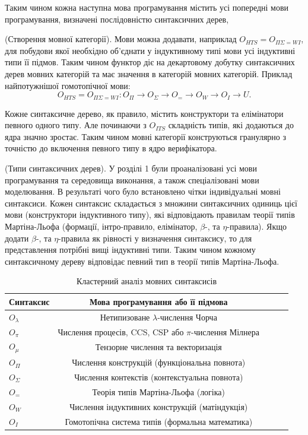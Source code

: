 Таким чином кожна наступна мова програмування містить усі попередні
мови програмування, визначені послідовністю синтаксичних дерев,

\begin{definition} (Створення мовної категорії).
Мови можна додавати, наприклад $O_{HTS} = O_{\Pi\Sigma=WI}$, для побудови якої необхідно
об'єднати у індуктивному типі мови усі індуктивні типи її підмов.
Таким чином функтор діє на декартовому добутку синтаксичних дерев мовних категорій
та має значення в категорій мовних категорій. Приклад найпотужнішої гомотопічної мови:
\begin{equation}
O_{HTS} = O_{\Pi\Sigma=WI} : O_\Pi \rightarrow O_\Sigma \rightarrow O_= \rightarrow O_W \rightarrow O_I \rightarrow U.
\end{equation}
\end{definition}

Кожне синтаксичне дерево, як правило, містить конструктори
та елімінатори певного одного типу. Але починаючи з $O_{ITS}$
складність типів, які додаються до ядра значно зростає.
Таким чином мовні категорії конструються гранулярно з
точністю до включення певного типу в ядро верифікатора.

\begin{definition} (Типи синтаксичних дерев).
У розділі 1 були проаналізовані усі мови програмування та середовища виконання,
а також спеціалізовані мови моделювання. В результаті чого було встановлено
чітки індивідуальні мовні синтаксиси. Кожен синтаксис складається з
множини синтаксичних одиниць цієї мови (конструктори індуктивного типу),
які відповідають правилам теорії типів Мартіна-Льофа (формації, інтро-правило,
елімінатор, $\beta$-, та $\eta$-правила). Якщо додати $\beta$-, та $\eta$-правила
як рівності у визначення синтаксису, то для представлення потрібні вищі індуктивні типи.
Таким чином кожному синтаксичному дереву відповідає певний тип в теорії типів Мартіна-Льофа.
\begin{table}
  \caption{Кластерний аналіз мовних синтаксисів}
 \begin{tabular}{lcccc}
    \hline
       Синтаксис & Мова програмування або її підмова \\
    \hline
       $O_\lambda$ & Нетипизоване $\lambda$-числення Чорча \\
       $O_\pi$     & Числення процесів, CCS, CSP або $\pi$-числення Мілнера\\
       $O_\mu$     & Тензорне числення та векторизація \\
    \hline
       $O_\Pi$     & Числення конструкцій (функціональна повнота) \\
       $O_\Sigma$  & Числення контекстів (контекстуальна повнота) \\
       $O_=$       & Теорія типів Мартіна-Льофа (логіка) \\
       $O_W$       & Числення індуктивних конструкцій (матіндукція) \\
       $O_I$       & Гомотопічна система типів (формальна математика) \\
      \hline
  \end{tabular}
\end{table}
\end{definition}

